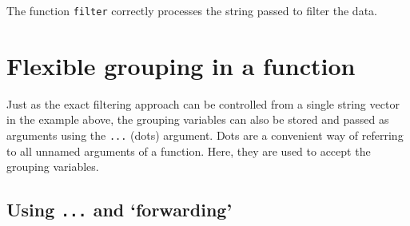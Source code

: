 \documentclass[]{book}
\newenvironment{Shaded}{}{}
\newcommand{\CommentTok}[1]{\textcolor[rgb]{0.38,0.63,0.69}{\textit{#1}}}
\newcommand{\DataTypeTok}[1]{\textcolor[rgb]{0.56,0.13,0.00}{#1}}
\newcommand{\KeywordTok}[1]{\textcolor[rgb]{0.00,0.44,0.13}{\textbf{#1}}}
\newcommand{\NormalTok}[1]{#1}
\newcommand{\OperatorTok}[1]{\textcolor[rgb]{0.40,0.40,0.40}{#1}}
\newcommand{\StringTok}[1]{\textcolor[rgb]{0.25,0.44,0.63}{#1}}
\begin{document}
\begin{Shaded}
\end{Shaded}

The function \texttt{filter} correctly processes the string passed to filter the data.

\hypertarget{flexible-grouping-in-a-function}{%
\section{Flexible grouping in a function}\label{flexible-grouping-in-a-function}}

Just as the exact filtering approach can be controlled from a single string vector in the example above, the grouping variables can also be stored and passed as arguments using the \texttt{...} (dots) argument. Dots are a convenient way of referring to all unnamed arguments of a function.
Here, they are used to accept the grouping variables.

\hypertarget{using-...-and-forwarding}{%
\subsection{\texorpdfstring{Using \texttt{...} and `forwarding'}{Using ... and `forwarding'}}\label{using-...-and-forwarding}}
\end{document}
